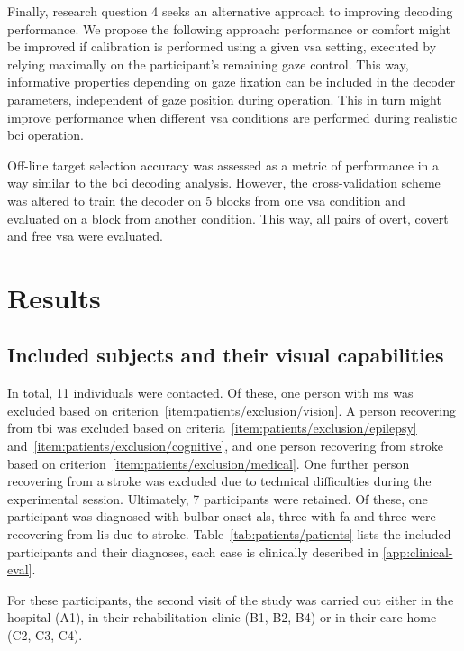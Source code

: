 \documentclass{article}
\begin{document}
Finally, research question 4 seeks an alternative approach to improving decoding
performance.
We propose the following approach: performance or comfort might be improved
if calibration is performed using a given \ac{vsa} setting, executed by relying
maximally on the participant's remaining gaze control.
This way, informative properties depending on gaze fixation can be included in the
decoder parameters, independent of gaze position during operation.
This in turn might improve performance when different \ac{vsa} conditions
are performed during realistic \ac{bci} operation.

Off-line target selection accuracy was assessed as a metric of performance in a way
similar to the \ac{bci} decoding analysis.
However, the cross-validation scheme was altered to train the decoder on 5 blocks
from one \ac{vsa} condition and evaluated on a block from another condition.
This way, all pairs of overt, covert and free \ac{vsa} were evaluated.


\section{Results}



\subsection{Included subjects and their visual capabilities}
\label{sec:patients/outcomes/gaze}

In total, 11 individuals were contacted. Of these, one person with
\ac{ms} was excluded based on criterion~\ref{item:patients/exclusion/vision}.
A person recovering from \ac{tbi} was excluded based on criteria~\ref{item:patients/exclusion/epilepsy}
and~\ref{item:patients/exclusion/cognitive}, and one person recovering from
stroke based on criterion~\ref{item:patients/exclusion/medical}.
One further person recovering from a stroke was excluded due to technical
difficulties during the experimental session. Ultimately, 7 participants were retained.
Of these, one participant was diagnosed with bulbar-onset \ac{als}, three with
\ac{fa} and three were recovering from \ac{lis} due to stroke.
Table~\ref{tab:patients/patients} lists the included participants and their
diagnoses, each case is clinically described in \cref{app:clinical-eval}.
\begin{table}
	\footnotesize
	
	\caption{Included participants with their diagnosis and relevant communication
		capabilities.
		W:\ classification according
		to~\textcite{Wolpaw2006} used as inclusion criterion, KB:\ classification according
		to~\textcite{Kuebler2008} for further reference.
	}%
	\label{tab:patients/patients}
\end{table}
For these participants, the second visit of the study was carried out either in the hospital (A1), in their
rehabilitation clinic (B1, B2, B4) or in their care home (C2, C3, C4).
\end{document}
